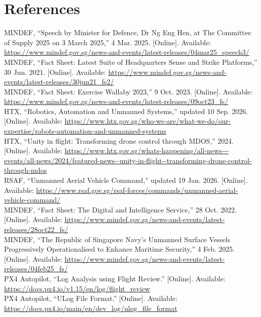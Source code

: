 \documentclass[11pt,a4paper]{article}
\begin{document}
\section*{References}
{\small
\noindent[1] MINDEF, ``Speech by Minister for Defence, Dr Ng Eng Hen, at The Committee of Supply 2025 on 3 March 2025,'' 4 Mar. 2025. [Online]. Available: \url{https://www.mindef.gov.sg/news-and-events/latest-releases/04mar25_speech3/}\\[0.25em]
\noindent[2] MINDEF, ``Fact Sheet: Latest Suite of Headquarters Sense and Strike Platforms,'' 30 Jun. 2021. [Online]. Available: \url{https://www.mindef.gov.sg/news-and-events/latest-releases/30jun21_fs2/}\\[0.25em]
\noindent[3] MINDEF, ``Fact Sheet: Exercise Wallaby 2023,'' 9 Oct. 2023. [Online]. Available: \url{https://www.mindef.gov.sg/news-and-events/latest-releases/09oct23_fs/}\\[0.25em]
\noindent[4] HTX, ``Robotics, Automation and Unmanned Systems,'' updated 10 Sep. 2026. [Online]. Available: \url{https://www.htx.gov.sg/who-we-are/what-we-do/our-expertise/robots-automation-and-unmanned-systems}\\[0.25em]
\noindent[5] HTX, ``Unity in flight: Transforming drone control through MDOS,'' 2024. [Online]. Available: \url{https://www.htx.gov.sg/whats-happening/all-news---events/all-news/2024/featured-news--unity-in-flight--transforming-drone-control-through-mdos}\\[0.25em]
\noindent[6] RSAF, ``Unmanned Aerial Vehicle Command,'' updated 19 Jan. 2026. [Online]. Available: \url{https://www.rsaf.gov.sg/rsaf-forces/commands/unmanned-aerial-vehicle-command/}\\[0.25em]
\noindent[7] MINDEF, ``Fact Sheet: The Digital and Intelligence Service,'' 28 Oct. 2022. [Online]. Available: \url{https://www.mindef.gov.sg/news-and-events/latest-releases/28oct22_fs/}\\[0.25em]
\noindent[8] MINDEF, ``The Republic of Singapore Navy's Unmanned Surface Vessels Progressively Operationalised to Enhance Maritime Security,'' 4 Feb. 2025. [Online]. Available: \url{https://www.mindef.gov.sg/news-and-events/latest-releases/04feb25_fs/}\\[0.25em]
\noindent[9] PX4 Autopilot, ``Log Analysis using Flight Review.'' [Online]. Available: \url{https://docs.px4.io/v1.15/en/log/flight_review}\\[0.25em]
\noindent[10] PX4 Autopilot, ``ULog File Format.'' [Online]. Available: \url{https://docs.px4.io/main/en/dev_log/ulog_file_format}\\[0.25em]
}
\end{document}
